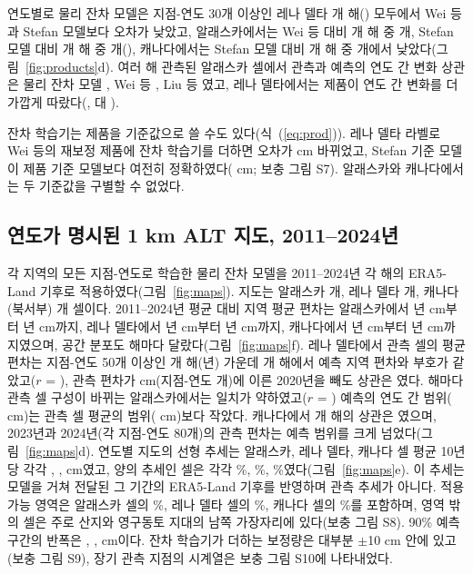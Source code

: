 연도별로 물리 잔차 모델은 지점-연도 30개 이상인 레나 델타 \nywLen{}개 해(\nyrsywLeko) 모두에서 Wei 등과 Stefan 모델보다 오차가 낮았고, 알래스카에서는 Wei 등 대비 \nywAkRoWein{}개 해 중 \nywAkRoWeiwin{}개, Stefan 모델 대비 \nywAkRoPon{}개 해 중 \nywAkRoPowin{}개(\nyrsywAkko), 캐나다에서는 Stefan 모델 대비 \nywCaRoPon{}개 해 중 \nywCaRoPowin{}개에서 낮았다(그림~\ref{fig:products}d). 여러 해 관측된 알래스카 셀에서 관측과 예측의 연도 간 변화 상관은 물리 잔차 모델 \nrdeltaAkRo, Wei 등 \nrdeltaAkWei, Liu 등 \nrdeltaAkLiu{}였고, 레나 델타에서는 제품이 연도 간 변화를 더 가깝게 따랐다(\nrdeltaLeWei, \nrdeltaLeLiu{} 대 \nrdeltaLeRo).

잔차 학습기는 제품을 기준값으로 쓸 수도 있다(식~(\ref{eq:prod})). 레나 델타 라벨로 Wei 등의 재보정 제품에 잔차 학습기를 더하면 오차가 \npadLeRpPcal{} cm 바뀌었고, Stefan 기준 모델이 제품 기준 모델보다 여전히 정확하였다(\npadLeRoRp{} cm; 보충 그림 S7). 알래스카와 캐나다에서는 두 기준값을 구별할 수 없었다.

\subsection{연도가 명시된 1 km ALT 지도, 2011--2024년}
각 지역의 모든 지점-연도로 학습한 물리 잔차 모델을 2011--2024년 각 해의 ERA5-Land 기후로 적용하였다(그림~\ref{fig:maps}). 지도는 알래스카 \nncellmapAk{}개, 레나 델타 \nncellmapLe{}개, 캐나다(북서부) \nncellmapCa{}개 셀이다. 2011--2024년 평균 대비 지역 평균 편차는 알래스카에서 \nanminyrAk{}년 \nanminAk{} cm부터 \nanmaxyrAk{}년 \nanmaxAk{} cm까지, 레나 델타에서 \nanminyrLe{}년 \nanminLe{} cm부터 \nanmaxyrLe{}년 \nanmaxLe{} cm까지, 캐나다에서 \nanminyrCa{}년 \nanminCa{} cm부터 \nanmaxyrCa{}년 \nanmaxCa{} cm까지였으며, 공간 분포도 해마다 달랐다(그림~\ref{fig:maps}f). 레나 델타에서 관측 셀의 평균 편차는 지점-연도 50개 이상인 \nanobsnLe{}개 해(\nanobsyrsLe{}년) 가운데 \nanobssameLe{}개 해에서 예측 지역 편차와 부호가 같았고($r$ = \nanobsrLe), 관측 편차가 \nanobsLeTwentyObs{} cm(지점-연도 \nanobsLeTwentyN{}개)에 이른 2020년을 빼도 상관은 \nanobsrLeNoTwenty{}였다. 해마다 관측 셀 구성이 바뀌는 알래스카에서는 일치가 약하였고($r$ = \nanobsrAk) 예측의 연도 간 범위(\nanpredrangeAk{} cm)는 관측 셀 평균의 범위(\nanobsrangeAk{} cm)보다 작았다. 캐나다에서 \nanobsnCa{}개 해의 상관은 \nanobsrCa{}였으며, 2023년과 2024년(각 지점-연도 80개)의 관측 편차는 예측 범위를 크게 넘었다(그림~\ref{fig:maps}d). 연도별 지도의 선형 추세는 알래스카, 레나 델타, 캐나다 셀 평균 10년당 각각 \ntrendAk{}, \ntrendLe{}, \ntrendCa{} cm였고, 양의 추세인 셀은 각각 \ntrendposAk\%, \ntrendposLe\%, \ntrendposCa\%였다(그림~\ref{fig:maps}e). 이 추세는 모델을 거쳐 전달된 그 기간의 ERA5-Land 기후를 반영하며 관측 추세가 아니다. 적용 가능 영역은 알래스카 셀의 \naoaAk\%, 레나 델타 셀의 \naoaLe\%, 캐나다 셀의 \naoaCa\%를 포함하며, 영역 밖의 셀은 주로 산지와 영구동토 지대의 남쪽 가장자리에 있다(보충 그림 S8). 90\% 예측 구간의 반폭은 \nhwAk{}, \nhwLe{}, \nhwCa{} cm이다. 잔차 학습기가 더하는 보정량은 대부분 $\pm$10 cm 안에 있고(보충 그림 S9), 장기 관측 지점의 시계열은 보충 그림 S10에 나타내었다.

